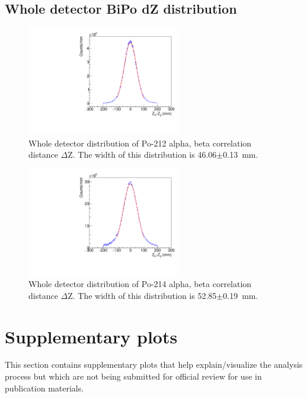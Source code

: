\subsection{Whole detector BiPo dZ distribution}
\begin{figure}[!h]
\centering
\includegraphics[width=0.6\textwidth]{figures/PubBiPo212dZ.pdf}
\caption{\label{fig:dZ212}Whole detector distribution of Po-212 alpha, beta correlation distance $\Delta$Z. The width of this distribution is 46.06$\pm$0.13~mm.}
\end{figure}
\begin{figure}[!h]
\centering
\includegraphics[width=0.6\textwidth]{figures/PubBiPo214dZ.pdf}
\caption{\label{fig:dZ214}Whole detector distribution of Po-214 alpha, beta correlation distance $\Delta$Z. The width of this distribution is 52.85$\pm$0.19~mm.}
\end{figure}
\newpage

\FloatBarrier

\section{Supplementary plots\label{sec:supp}}

This section contains supplementary plots that help explain/visualize the analysis process but which are not being submitted for official review for use in publication materials.

